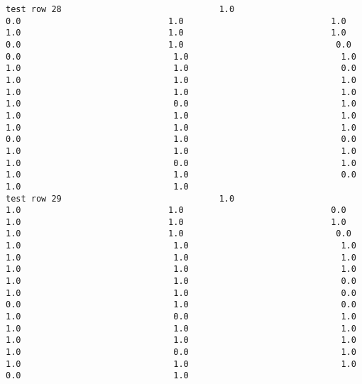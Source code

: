\documentclass[11pt]{article}
\begin{document}
\begin{verbatim}
test row 28                               1.0                             0.0                             1.0                             1.0                             1.0                             1.0                             1.0                             0.0                             1.0                              0.0                              0.0                              1.0                              1.0                              1.0                              1.0                              0.0                              1.0                              1.0                              1.0                              1.0                              1.0                              1.0                              1.0                              0.0                              1.0                              1.0                              1.0                              1.0                              1.0                              1.0                              1.0                              0.0                              1.0                              0.0                              1.0                              1.0                              1.0                              1.0                              0.0                              1.0                              1.0                              1.0                              0.0                              1.0                              1.0
test row 29                               1.0                             1.0                             1.0                             0.0                             1.0                             1.0                             1.0                             1.0                             1.0                              0.0                              1.0                              1.0                              1.0                              1.0                              1.0                              1.0                              1.0                              1.0                              1.0                              1.0                              1.0                              0.0                              1.0                              1.0                              0.0                              0.0                              1.0                              0.0                              1.0                              0.0                              1.0                              1.0                              1.0                              1.0                              1.0                              1.0                              1.0                              1.0                              0.0                              1.0                              1.0                              1.0                              1.0                              0.0                              1.0

\end{verbatim}
\end{document}
